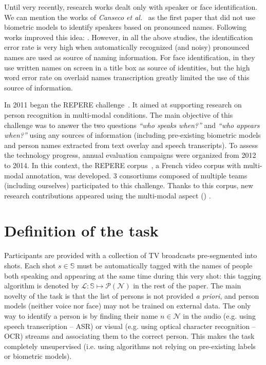 \documentclass{acm_proc_article-me}
\newcommand\shots{\mathbb{S}}
\newcommand\hypLabels{\mathcal{L}}
\newcommand\hypNames{\mathcal{N}}
\begin{document}
Until very recently, research works dealt only with speaker or face identification. We can mention the works of \textit{Canseco et al.}~\cite{CANSECO--ASRU--2005, CANSECO--INTERSPEECH--2004} as the first paper that did not use biometric models to identify speakers based on pronounced names. Following works improved this idea: \cite{ESTEVE--INTERSPEECH--2007, JOUSSE--ICCASP--2009, MAUCLAIR--Odyssey--2006, TRANTER--ICASSP--2006}. However, in all the above studies, the identification error rate is very high when automatically recognized (and noisy) pronounced names are used as source of naming information. For face identification, in \cite{HOUGHTON--IS--1999, SATOH--IEEEMM--1999, YANG--ACMMM--2004, YANG--ACMMM--2005} they use written names on screen in a title box as source of identities, but the high word error rate on overlaid names transcription greatly limited the use of this source of information.

In 2011 began the REPERE challenge~\cite{BERNARD--SLAM--2013, KAHN--CBMI--2012}. It aimed at supporting research on person recognition in multi-modal conditions. The main objective of this challenge was to answer the two questions \emph{``who speaks when?''} and \emph{``who appears when?''} using any sources of information (including pre-existing biometric models and person names extracted from text overlay and speech transcripts). To assess the technology progress, annual evaluation campaigns were organized from 2012 to 2014. In this context, the REPERE corpus~\cite{GIRAUDEL--LREC--2012}, a French video corpus with multi-modal annotation, was developed. 3 consortiums composed of multiple teams (including ourselves) participated to this challenge. Thanks to this corpus, new research contributions appeared using the multi-modal aspect (\cite{BECHET--INTERSPEECH--2014, BENDRIS--CBMI--2013, BREDIN--ODYSSEY--2014, BREDIN--INTERSPEECH--2013, BREDIN--SLAM--2013, BREDIN--IJMIR--2014, FAVRE--SLAM--2013, GAY--CBMI--2014, POIGNANT--ASLP--2015, POIGNANT--SLAM--2013, POIGNANT--INTERSPEECH--2012, POIGNANT--MTAP--2015, ROUVIER--CBMI--2014})  .

\section{Definition of the task}

Participants are provided with a collection of TV broadcasts pre-segmented into shots.
Each shot $s \in \shots$ must be automatically tagged with the names of people both speaking and appearing at the same time during this very shot: this tagging algorithm is denoted by $\hypLabels : \shots \mapsto \mathcal{P}(\hypNames)$ in the rest of the paper.
The main novelty of the task is that the list of persons is not provided \emph{a priori}, and person models (neither voice nor face) may not be trained on external data. The only way to identify a person is by finding their name $n \in \hypNames$ in the audio (e.g. using speech transcription -- ASR) or visual (e.g. using optical character recognition -- OCR) streams and associating them to the correct person.
This makes the task completely unsupervised (i.e. using algorithms not relying on pre-existing labels or biometric models).
\end{document}
